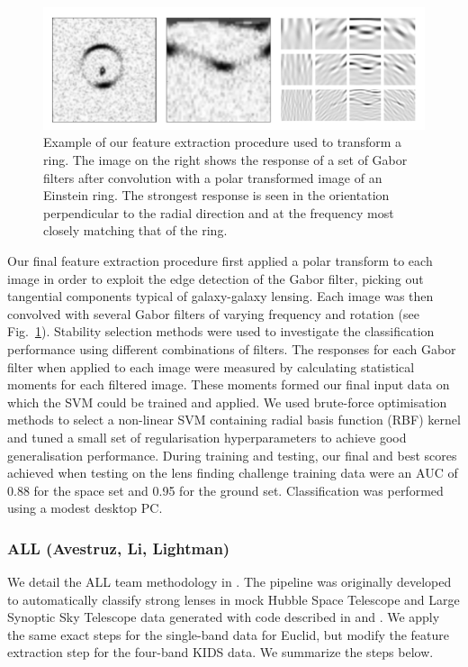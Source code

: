 \documentclass{aa}
\begin{document}
\begin{figure}
  \centering
      \includegraphics[width=1\columnwidth]{figures/polarfilter.pdf} 
  \caption{Example of our feature extraction procedure used to transform a ring. The image on the right shows the response of a set of Gabor filters after convolution with a polar transformed image of an Einstein ring. The strongest response is seen in the orientation perpendicular to the radial direction and at the frequency most closely matching that of the ring.}
 \label{gaborring}
\end{figure}

Our final feature extraction procedure first applied a polar transform to each image in order to exploit the edge detection of the Gabor filter, picking out tangential components typical of galaxy-galaxy lensing. Each image was then convolved with several Gabor filters of varying frequency and rotation (see Fig.~\ref{gaborring}). Stability selection methods were used to investigate the classification performance using different combinations of filters. The responses for each Gabor filter when applied to each image were measured by calculating statistical moments for each filtered image. These moments formed  our final input data on which the SVM could be trained and applied. We used brute-force optimisation methods to select a non-linear SVM containing radial basis function (RBF) kernel and tuned a small set of regularisation hyperparameters to achieve good generalisation performance. During training and testing, our final and best scores achieved when testing on the lens finding challenge training data were an AUC of 0.88 for the space set and 0.95 for the ground set. Classification was performed using a modest desktop PC.

\subsubsection{ALL (Avestruz, Li, Lightman)}

We detail the ALL team methodology in \citet{avestruz_etal17}. The
pipeline was originally developed to automatically classify strong
lenses in mock Hubble Space Telescope and Large Synoptic Sky Telescope
data generated with code described in \citet{li_etal16} and
\citet{collett_15}.  We apply the same exact steps for the single-band
data for Euclid, but modify the feature extraction step for the
four-band KIDS data.  We summarize the steps below.
\end{document}
